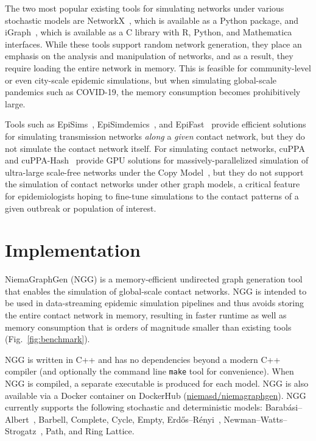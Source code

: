 \documentclass[a4paper,num-refs,gigabyte]{oup-contemporary}
\begin{document}
The two most popular existing tools for simulating networks under various stochastic models are NetworkX~\cite{Hagberg2008}, which is available as a Python package, and iGraph~\cite{Csardi2006}, which is available as a C library with R, Python, and Mathematica interfaces. While these tools support random network generation, they place an emphasis on the analysis and manipulation of networks, and as a result, they require loading the entire network in memory. This is feasible for community-level or even city-scale epidemic simulations, but when simulating global-scale pandemics such as COVID-19, the memory consumption becomes prohibitively large.

Tools such as EpiSims~\cite{Eubank2004}, EpiSimdemics~\cite{Barrett2008}, and EpiFast~\cite{Bisset2009} provide efficient solutions for simulating transmission networks \textit{along} a \textit{given} contact network, but they do not simulate the contact network itself. For simulating contact networks, cuPPA~\cite{Alam2017} and  cuPPA-Hash~\cite{Alam2019} provide GPU solutions for massively-parallelized simulation of ultra-large scale-free networks under the Copy Model~\cite{Kumar2000}, but they do not support the simulation of contact networks under other graph models, a critical feature for epidemiologists hoping to fine-tune simulations to the contact patterns of a given outbreak or population of interest.

\section{Implementation}

NiemaGraphGen (NGG) is a memory-efficient undirected graph generation tool that enables the simulation of global-scale contact networks. NGG is intended to be used in data-streaming epidemic simulation pipelines and thus avoids storing the entire contact network in memory, resulting in faster runtime as well as memory consumption that is orders of magnitude smaller than existing tools (Fig.~\ref{fig:benchmark}).

NGG is written in C++ and has no dependencies beyond a modern C++ compiler (and optionally the command line \texttt{make} tool for convenience). When NGG is compiled, a separate executable is produced for each model. NGG is also available via a Docker container on DockerHub (\href{https://hub.docker.com/r/niemasd/niemagraphgen}{niemasd/niemagraphgen}). NGG currently supports the following stochastic and deterministic models: Barab\'asi--Albert~\cite{Barabasi1999}, Barbell, Complete, Cycle, Empty, Erd{\H o}s--R\'enyi~\cite{Erdos1959}, Newman--Watts--Strogatz~\cite{Newman1999}, Path, and Ring Lattice.
\end{document}
